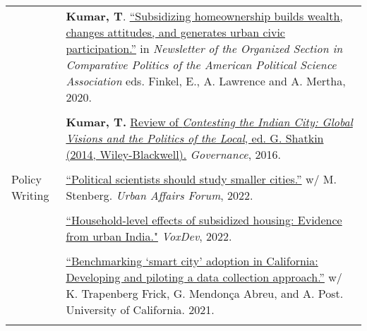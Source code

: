 \documentclass[letterpaper, 10.5pt]{article}
\begin{document}
\begin{longtable}{p{1.5in}p{5in}}
& \textbf{Kumar, T}.
 \href{https://www.comparativepoliticsnewsletter.org/wp-content/uploads/2020/05/Spring-Newsletter-2020.pdf}{``Subsidizing homeownership builds wealth, changes attitudes, and generates urban civic participation.''} in \textit{Newsletter of the Organized Section in Comparative Politics of the American Political Science Association} eds. Finkel, E., A. Lawrence and A. Mertha, 2020. \\
&\\
& \textbf{Kumar, T.} \href{http://onlinelibrary.wiley.com/doi/10.1111/gove.12241/abstract}{Review of \textit{Contesting the Indian City: Global Visions and the Politics of the Local}, ed. G. Shatkin (2014, Wiley-Blackwell).} \textit{Governance}, 2016. 

\\

& \\


Policy Writing &

\href{https://urbanaffairsreview.com/2022/10/11/why-political-scientists-should-study-smaller-cities/}{``Political scientists should study smaller cities.''} w/ M. Stenberg. \textit{Urban Affairs Forum}, 2022.\\

& \\
& \href{https://voxdev.org/topic/infrastructure-urbanisation/household-level-effects-subsidised-housing-evidence-urban-india?utm_source=dlvr.it&utm_medium=twitter}{``Household-level effects of subsidized housing: Evidence from urban India."} \textit{VoxDev}, 2022.\\
& \\

& \href{https://escholarship.org/uc/item/3797p0ws}{``Benchmarking `smart city' adoption in California: Developing and piloting a data collection approach.''} w/ K. Trapenberg Frick, G. Mendon\c{c}a Abreu, and A. Post. University of California. 2021. \\
& \\


\end{longtable}
\end{document}

